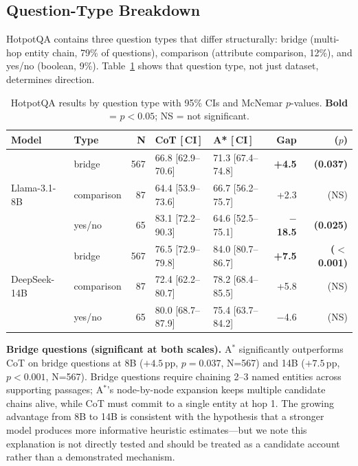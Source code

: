 \documentclass{article}
\newcommand{\astar}{A$^*$\xspace}
\begin{document}
\subsection{Question-Type Breakdown}
\label{sec:qtype}

HotpotQA contains three question types that differ structurally: bridge (multi-hop entity chain, 79\% of questions), comparison (attribute comparison, 12\%), and yes/no (boolean, 9\%). Table~\ref{tab:qtype} shows that question type, not just dataset, determines direction.

\begin{table}[h]
\centering
\caption{HotpotQA results by question type with 95\% CIs and McNemar $p$-values.
  \textbf{Bold} = $p<0.05$; NS = not significant.}
\label{tab:qtype}
\small
\begin{tabular}{llrllrr}
\toprule
Model & Type & N & CoT [\,CI\,] & A* [\,CI\,] & Gap & ($p$) \\
\midrule
\multirow{3}{*}{Llama-3.1-8B}
  & bridge     & 567 & 66.8 [62.9--70.6] & 71.3 [67.4--74.8] & \textbf{+4.5} & \textbf{(0.037)} \\
  & comparison &  87 & 64.4 [53.9--73.6] & 66.7 [56.2--75.7] & +2.3  & (NS) \\
  & yes/no     &  65 & 83.1 [72.2--90.3] & 64.6 [52.5--75.1] & \textbf{$-$18.5} & \textbf{(0.025)} \\
\midrule
\multirow{3}{*}{DeepSeek-14B}
  & bridge     & 567 & 76.5 [72.9--79.8] & 84.0 [80.7--86.7] & \textbf{+7.5} & \textbf{($<$0.001)} \\
  & comparison &  87 & 72.4 [62.2--80.7] & 78.2 [68.4--85.5] & +5.8  & (NS) \\
  & yes/no     &  65 & 80.0 [68.7--87.9] & 75.4 [63.7--84.2] & $-$4.6 & (NS) \\
\bottomrule
\end{tabular}
\end{table}

\textbf{Bridge questions (significant at both scales).}
\astar significantly outperforms CoT on bridge questions at 8B ($+4.5$\,pp, $p=0.037$, N=567) and 14B ($+7.5$\,pp, $p<0.001$, N=567).
Bridge questions require chaining 2--3 named entities across supporting passages; \astar's node-by-node expansion keeps multiple candidate chains alive, while CoT must commit to a single entity at hop 1.
The growing advantage from 8B to 14B is consistent with the hypothesis that a stronger model produces more informative heuristic estimates---but we note this explanation is not directly tested and should be treated as a candidate account rather than a demonstrated mechanism.
\end{document}
